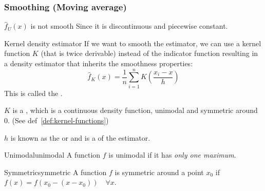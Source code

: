\clearpage
\subsubsection{Smoothing (Moving average)}
\begin{prop}{$\widehat{f}_U(x)$ is not smooth}{}
	Since it is discontinuous and piecewise constant.
\end{prop}
\begin{definition}{Kernel density estimator}{}
	If we want to smooth the estimator, we can use a kernel function $K$ (that is twice derivable) instead
	of the indicator function resulting in a density estimator that inherits the
	smoothness properties:
	\begin{equation}
		\widehat{f}_K(x) = \frac{1}{n}\sum_{i=1}^n K\left( \frac{x_i - x}{h} \right)
		\tag{kernel density estimator}
	\end{equation}
	This is called the .
	\tcblower

	$K$ is a , which is a continuous density function, unimodal
	and symmetric around $0$. (See def~\ref{def:kernel-functions})

	$h$ is known as the  or  and is a
	 of the estimator.
\end{definition}

\begin{definition}{Unimodal}{unimodal}
	A function $f$ is unimodal if it has \emph{only one maximum}.
\end{definition}

\begin{definition}{Symmetric}{symmetric}
	A function $f$ is symmetric around a point $x_0$ if $f(x) = f(x_0 - (x - x_0)) \quad \forall x$.
\end{definition}

